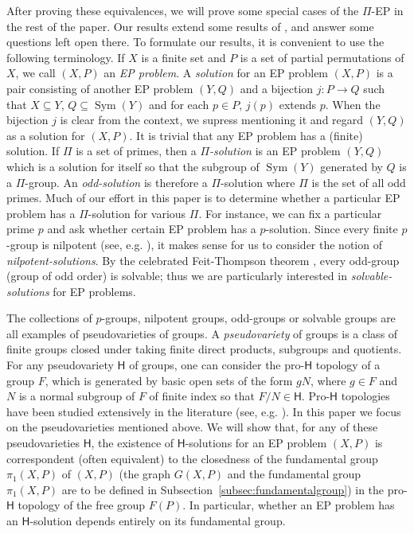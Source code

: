 \documentclass[11pt]{amsart}
\theoremstyle{definition}
\theoremstyle{definition}
\numberwithin{equation}{section}
\begin{document}
After proving these equivalences, we will prove some special cases of the $\Pi$-EP in the rest of the paper. Our results extend some results of \cite{HPSW19}, and answer some questions left open there. To formulate our results, it is convenient to use the following terminology. If $X$ is a finite set and $P$ is a set of partial permutations of $X$, we call $(X, P)$ an \emph{EP problem}. A \emph{solution} for an EP problem $(X, P)$ is a pair consisting of another EP problem $(Y, Q)$ and a bijection $j\colon P\to Q$ such that $X\subseteq Y$, $Q\subseteq \operatorname{Sym}(Y)$ and for each $p\in P$, $j(p)$ extends $p$. When the bijection $j$ is clear from the context, we supress mentioning it and regard $(Y, Q)$ as a solution for $(X, P)$. It is trivial that any EP problem has a (finite) solution. If $\Pi$ is a set of primes, then a \emph{$\Pi$-solution} is an EP problem $(Y, Q)$  which is a solution for itself so that the subgroup of $\operatorname{Sym}(Y)$ generated by $Q$ is a $\Pi$-group. An \emph{odd-solution} is therefore a $\Pi$-solution where $\Pi$ is the set of all odd primes. Much of our effort in this paper is to determine whether a particular EP problem has a $\Pi$-solution for various $\Pi$. For instance, we can fix a particular prime $p$ and ask whether certain EP problem has a $p$-solution. Since every finite $p$-group is nilpotent (see, e.g. \cite[5.1.3]{RobinsonBook}), it makes sense for us to consider the notion of \emph{nilpotent-solutions}. By the celebrated Feit-Thompson theorem \cite{FT63}, every odd-group (group of odd order) is solvable; thus we are particularly interested in \emph{solvable-solutions} for EP problems. 

The collections of $p$-groups, nilpotent groups, odd-groups or solvable groups are all examples of pseudovarieties of groups. A \emph{pseudovariety} of groups is a class of finite groups closed under taking finite direct products, subgroups and quotients.  For any pseudovariety $\mathsf{H}$ of groups, one can consider the pro-$\mathsf{H}$ topology of a group $F$, which is generated by basic open sets of the form $gN$, where $g\in F$ and $N$ is a normal subgroup of $F$ of finite index so that $F/N\in \mathsf{H}$. Pro-$\mathsf{H}$ topologies have been studied extensively in the literature (see, e.g. \cite{RZ94, MSW01, AS04, AS05, AS06, RZBook, MST24a, MST24b, MST25, MST26}). In this paper we focus on the pseudovarieties mentioned above. 
We will show that, for any of these pseudovarieties $\mathsf{H}$, the existence of $\mathsf{H}$-solutions for an EP problem $(X, P)$ is correspondent (often equivalent) to the closedness of the fundamental group $\pi_1(X, P)$ of $(X, P)$ (the graph $G(X, P)$ and the fundamental group $\pi_1(X, P)$ are to be defined in Subsection~\ref{subsec:fundamentalgroup}) in the pro-$\mathsf{H}$ topology of the free group $F(P)$. In particular, whether an EP problem has an $\mathsf{H}$-solution depends entirely on its fundamental group. 
\end{document}
